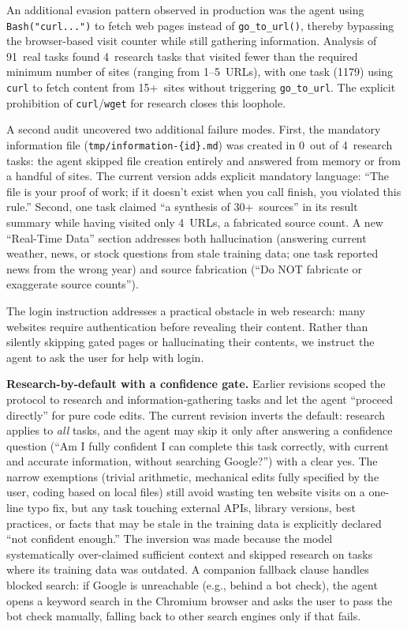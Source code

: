 \documentclass{article}
\begin{document}
An additional evasion pattern observed in production was the agent using \texttt{Bash("curl...")} to fetch web pages instead of \texttt{go\_to\_url()}, thereby bypassing the browser-based visit counter while still gathering information.  Analysis of 91~real tasks found 4~research tasks that visited fewer than the required minimum number of sites (ranging from 1--5~URLs), with one task (1179) using \texttt{curl} to fetch content from 15+~sites without triggering \texttt{go\_to\_url}.  The explicit prohibition of \texttt{curl}/\texttt{wget} for research closes this loophole.

A second audit uncovered two additional failure modes.  First, the mandatory information file (\texttt{tmp/information-\{id\}.md}) was created in 0~out of 4~research tasks: the agent skipped file creation entirely and answered from memory or from a handful of sites.  The current version adds explicit mandatory language: ``The file is your proof of work; if it doesn't exist when you call finish, you violated this rule.''  Second, one task claimed ``a synthesis of 30+~sources'' in its result summary while having visited only 4~URLs, a fabricated source count.  A new ``Real-Time Data'' section addresses both hallucination (answering current weather, news, or stock questions from stale training data; one task reported news from the wrong year) and source fabrication (``Do NOT fabricate or exaggerate source counts'').

The login instruction addresses a practical obstacle in web research: many websites require authentication before revealing their content.  Rather than silently skipping gated pages or hallucinating their contents, we instruct the agent to ask the user for help with login.

\textbf{Research-by-default with a confidence gate.}  Earlier revisions scoped the protocol to research and information-gathering tasks and let the agent ``proceed directly'' for pure code edits.  The current revision inverts the default: research applies to \emph{all} tasks, and the agent may skip it only after answering a confidence question (``Am I fully confident I can complete this task correctly, with current and accurate information, without searching Google?'') with a clear yes.  The narrow exemptions (trivial arithmetic, mechanical edits fully specified by the user, coding based on local files) still avoid wasting ten website visits on a one-line typo fix, but any task touching external APIs, library versions, best practices, or facts that may be stale in the training data is explicitly declared ``not confident enough.''  The inversion was made because the model systematically over-claimed sufficient context and skipped research on tasks where its training data was outdated.  A companion fallback clause handles blocked search: if Google is unreachable (e.g., behind a bot check), the agent opens a keyword search in the Chromium browser and asks the user to pass the bot check manually, falling back to other search engines only if that fails.
\end{document}
